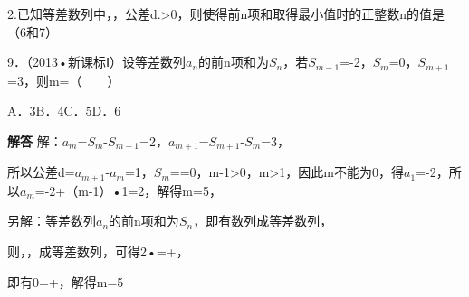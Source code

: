 \qquad{}2.已知等差数列中，，公差d.>0，则使得前n项和取得最小值时的正整数n的值是（6和7）  \par
{}
9．（2013•新课标Ⅰ）设等差数列{\ensuremath{a_{n}}}的前n项和为\ensuremath{S_{n}}，若\ensuremath{S_{m-1}}=-2，\ensuremath{S_{m}}=0，\ensuremath{S_{m+1}}=3，则m=（　　）\par
\qquad{}\qquad{}\qquad{}A．3\qquad{}B．4\qquad{}C．5\qquad{}D．6\qquad{}\par
\QuestionSpace{1.2cm}
\ifshowanswers
\par\begingroup\color{solutioncolor}\noindent\textbf{解答}\quad
解：\ensuremath{a_{m}}=\ensuremath{S_{m}}-\ensuremath{S_{m-1}}=2，\ensuremath{a_{m+1}}=\ensuremath{S_{m+1}}-\ensuremath{S_{m}}=3，\par
所以公差d=\ensuremath{a_{m+1}}-\ensuremath{a_{m}}=1，\ensuremath{S_{m}}==0，m-1>0，m>1，因此m不能为0，得\ensuremath{a_{1}}=-2，所以\ensuremath{a_{m}}=-2+（m-1）•1=2，解得m=5，\par
另解：等差数列{\ensuremath{a_{n}}}的前n项和为\ensuremath{S_{n}}，即有数列{}成等差数列，\par
则，，成等差数列，可得2•=+，\par
即有0=+，解得m=5\par
\par\endgroup\fi

